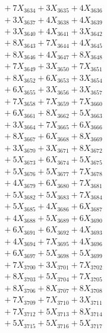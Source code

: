 \documentclass[a4paper,10pt]{article}
\begin{document}
{\begin{align}
&\;  + 7 X_{3634} + 3 X_{3635} + 4 X_{3636} \\[0.3ex]
&\;  + 3 X_{3637} + 4 X_{3638} + 4 X_{3639} \\[0.5ex]\allowbreak
&\;  + 3 X_{3640} + 4 X_{3641} + 3 X_{3642} \\[0.3ex]
&\;  + 8 X_{3643} + 7 X_{3644} + 4 X_{3645} \\[0.3ex]
&\;  + 8 X_{3646} + 4 X_{3647} + 8 X_{3648} \\[0.3ex]
&\;  + 7 X_{3649} + 3 X_{3650} + 7 X_{3651} \\[0.3ex]
&\;  + 8 X_{3652} + 6 X_{3653} + 3 X_{3654} \\[0.3ex]
&\;  + 6 X_{3655} + 3 X_{3656} + 3 X_{3657} \\[0.3ex]
&\;  + 7 X_{3658} + 7 X_{3659} + 7 X_{3660} \\[0.3ex]
&\;  + 6 X_{3661} + 8 X_{3662} + 5 X_{3663} \\[0.3ex]
&\;  + 3 X_{3664} + 7 X_{3665} + 6 X_{3666} \\[0.3ex]
&\;  + 8 X_{3667} + 6 X_{3668} + 8 X_{3669} \\[0.5ex]\allowbreak
&\;  + 3 X_{3670} + 3 X_{3671} + 8 X_{3672} \\[0.3ex]
&\;  + 5 X_{3673} + 6 X_{3674} + 5 X_{3675} \\[0.3ex]
&\;  + 5 X_{3676} + 5 X_{3677} + 7 X_{3678} \\[0.3ex]
&\;  + 4 X_{3679} + 6 X_{3680} + 7 X_{3681} \\[0.3ex]
&\;  + 5 X_{3682} + 5 X_{3683} + 7 X_{3684} \\[0.3ex]
&\;  + 5 X_{3685} + 4 X_{3686} + 6 X_{3687} \\[0.3ex]
&\;  + 4 X_{3688} + 5 X_{3689} + 6 X_{3690} \\[0.3ex]
&\;  + 6 X_{3691} + 6 X_{3692} + 4 X_{3693} \\[0.3ex]
&\;  + 4 X_{3694} + 7 X_{3695} + 4 X_{3696} \\[0.3ex]
&\;  + 6 X_{3697} + 5 X_{3698} + 5 X_{3699} \\[0.5ex]\allowbreak
&\;  + 7 X_{3700} + 3 X_{3701} + 7 X_{3702} \\[0.3ex]
&\;  + 8 X_{3703} + 5 X_{3704} + 7 X_{3705} \\[0.3ex]
&\;  + 8 X_{3706} + 8 X_{3707} + 8 X_{3708} \\[0.3ex]
&\;  + 7 X_{3709} + 7 X_{3710} + 3 X_{3711} \\[0.3ex]
&\;  + 7 X_{3712} + 5 X_{3713} + 8 X_{3714} \\[0.3ex]
&\;  + 5 X_{3715} + 5 X_{3716} + 5 X_{3717} \\[0.3ex]

\end{align}}
\end{document}
